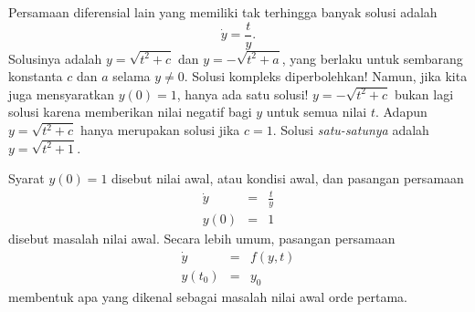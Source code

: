 Persamaan diferensial lain yang memiliki tak terhingga banyak solusi
adalah 
\[
\dot{y}=\frac{t}{y}.
\]
Solusinya adalah $y=\sqrt{t^{2}+c}$ dan $y=-\sqrt{t^{2}+a}$, yang
berlaku untuk sembarang konstanta $c$ dan $a$ selama $y\neq0$.
Solusi kompleks diperbolehkan! Namun, jika kita juga mensyaratkan
$y(0)=1$, hanya ada satu solusi! $y=-\sqrt{t^{2}+c}$ bukan lagi
solusi karena memberikan nilai negatif bagi $y$ untuk semua nilai
$t$. Adapun $y=\sqrt{t^{2}+c}$ hanya merupakan solusi jika $c=1$.
Solusi \textit{satu-satunya} adalah $y=\sqrt{t^{2}+1}$. 

Syarat $y(0)=1$ disebut nilai awal, atau kondisi awal, dan pasangan
persamaan
\begin{eqnarray*}
\dot{y} & = & \frac{t}{y}\\
y(0) & = & 1
\end{eqnarray*}
 disebut masalah nilai awal. Secara lebih umum, pasangan persamaan
\begin{eqnarray*}
\dot{y} & = & f(y,t)\\
y(t_{0}) & = & y_{0}
\end{eqnarray*}
membentuk apa yang dikenal sebagai masalah nilai awal orde pertama.

